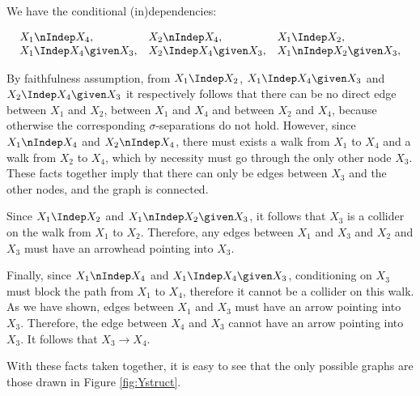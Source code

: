 \begin{enumerate}
\begin{gradedsolution}
	We have the conditional (in)dependencies:

	$$\begin{array}{lll}
		X_1 \nIndep X_4,  & X_2 \nIndep X_4, & X_1 \Indep X_2, \\
		X_1 \Indep X_4 \given X_3, & X_2 \Indep X_4 \given X_3, & X_1 \nIndep X_2 \given X_3,
	  \end{array}$$
	
	By faithfulness assumption, from $X_1 \Indep X_2$, $X_1 \Indep X_4 \given X_3$ and $ X_2 \Indep X_4 \given X_3$ it respectively follows that there can be no direct edge between $X_1$ and $X_2$, between $X_1$ and $X_4$ and between $X_2$ and $X_4$, because otherwise the corresponding $\sigma$-separations do not hold. However, since $X_1 \nIndep X_4$ and  $X_2 \nIndep X_4$, there must exists a walk from $X_1$ to $X_4$ and a walk from $X_2$ to $X_4$, which by necessity must go through the only other node $X_3$. These facts together imply that there can only be edges between $X_3$ and the other nodes, and the graph is connected.

	Since $X_1 \Indep X_2$ and $X_1 \nIndep X_2 \given X_3$, it follows that $X_3$ is a collider on the walk from $X_1$ to $X_2$. Therefore, any edges between $X_1$ and $X_3$ and $X_2$ and $X_3$ must have an arrowhead pointing into $X_3$.

	Finally, since $X_1 \nIndep X_4$ and $X_1 \Indep X_4 \given X_3$, conditioning on $X_3$ must block the path from $X_1$ to $X_4$, therefore it cannot be a collider on this walk. As we have shown, edges between $X_1$ and $X_3$ must have an arrow pointing into $X_3$. Therefore, the edge between $X_4$ and $X_3$ cannot have an arrow pointing into $X_3$. It follows that $X_3 \to X_4$.
	
	With these facts taken together, it is easy to see that the only possible graphs are those drawn in Figure \ref*{fig:Ystruct}.
\end{gradedsolution}

\end{enumerate}

